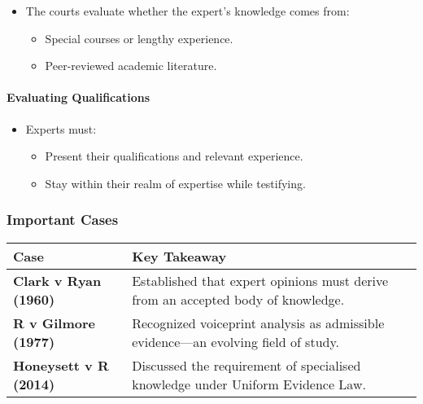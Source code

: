 \begin{itemize}
\tightlist
\item
  The courts evaluate whether the expert's knowledge comes from:

  \begin{itemize}
  \tightlist
  \item
    Special courses or lengthy experience.
  \item
    Peer-reviewed academic literature.
  \end{itemize}
\end{itemize}

\paragraph{Evaluating Qualifications}\label{evaluating-qualifications}

\begin{itemize}
\tightlist
\item
  Experts must:

  \begin{itemize}
  \tightlist
  \item
    Present their qualifications and relevant experience.
  \item
    Stay within their realm of expertise while testifying.
  \end{itemize}
\end{itemize}

\subsubsection{Important Cases}\label{important-cases-2}

\begin{longtable}[]{@{}
  >{\raggedright\arraybackslash}p{}
  >{\raggedright\arraybackslash}p{}@{}}
\toprule\noalign{}
\begin{minipage}[b]{\linewidth}\raggedright
\textbf{Case}
\end{minipage} & \begin{minipage}[b]{\linewidth}\raggedright
\textbf{Key Takeaway}
\end{minipage} \\
\midrule\noalign{}
\endhead
\bottomrule\noalign{}
\endlastfoot
\textbf{Clark v Ryan (1960)} & Established that expert opinions must
derive from an accepted body of knowledge. \\
\textbf{R v Gilmore (1977)} & Recognized voiceprint analysis as
admissible evidence---an evolving field of study. \\
\textbf{Honeysett v R (2014)} & Discussed the requirement of specialised
knowledge under Uniform Evidence Law. \\
\end{longtable}

